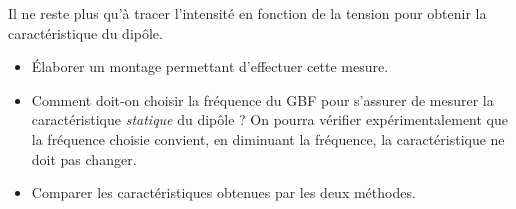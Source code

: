 \documentclass[]{tp}
\begin{document}
Il ne reste plus qu'à tracer l'intensité en fonction de la tension pour obtenir la caractéristique du dipôle. 

\begin{itemize}
	\item \'Elaborer un montage permettant d'effectuer cette mesure.
	\item Comment doit-on choisir la fréquence du GBF pour s'assurer de mesurer la caractéristique \emph{statique} du dipôle ? On pourra vérifier expérimentalement que la fréquence choisie convient, en diminuant la fréquence, la caractéristique ne doit pas changer.
	\item Comparer les caractéristiques obtenues par les deux méthodes.
\end{itemize}
\end{document}
